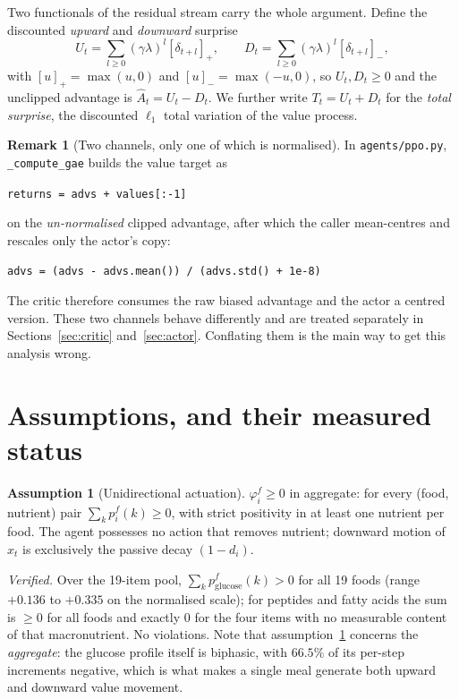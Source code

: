 \documentclass[11pt]{article}
\theoremstyle{definition}
\newtheorem{assumption}{Assumption}
\newtheorem{remark}[theorem]{Remark}
\newcommand{\Ahat}{\hat A}
\newcommand{\up}[1]{\left[#1\right]_{+}}
\newcommand{\dn}[1]{\left[#1\right]_{-}}
\begin{document}
Two functionals of the residual stream carry the whole argument. Define the
discounted \emph{upward} and \emph{downward} surprise
\begin{equation}
U_t=\sum_{l\ge0}(\gamma\lambda)^l\up{\delta_{t+l}},
\qquad
D_t=\sum_{l\ge0}(\gamma\lambda)^l\dn{\delta_{t+l}},
\label{eq:UD}
\end{equation}
with $\up{u}=\max(u,0)$ and $\dn{u}=\max(-u,0)$, so $U_t,D_t\ge0$ and the
unclipped advantage is $\Ahat_t=U_t-D_t$. We further write
$T_t=U_t+D_t$ for the \emph{total surprise}, the discounted $\ell_1$ total
variation of the value process.

\begin{remark}[Two channels, only one of which is normalised]
\label{rem:channels}
In \texttt{agents/ppo.py}, \texttt{\_compute\_gae} builds the value target as
\begin{center}
\texttt{returns = advs + values[:-1]}
\end{center}
on the \emph{un-normalised} clipped advantage, after which the caller
mean-centres and rescales only the actor's copy:
\begin{center}
\texttt{advs = (advs - advs.mean()) / (advs.std() + 1e-8)}
\end{center}
The critic
therefore consumes the raw biased advantage and the actor a centred version.
These two channels behave differently and are treated separately in
Sections~\ref{sec:critic} and~\ref{sec:actor}. Conflating them is the main
way to get this analysis wrong.
\end{remark}

\section{Assumptions, and their measured status}
\label{sec:assumptions}

\begin{assumption}[Unidirectional actuation]
\label{as:actuation}
$\varphi^f_i\ge0$ in aggregate: for every (food, nutrient) pair
$\sum_k p^f_i(k)\ge0$, with strict positivity in at least one nutrient per
food. The agent possesses no action that removes nutrient; downward motion of
$x_t$ is exclusively the passive decay $(1-d_i)$.
\end{assumption}

\noindent
\emph{Verified.} Over the 19-item pool, $\sum_k p^f_{\text{glucose}}(k)>0$ for
all 19 foods (range $+0.136$ to $+0.335$ on the normalised scale); for
peptides and fatty acids the sum is $\ge0$ for all foods and exactly $0$ for
the four items with no measurable content of that macronutrient. No
violations. Note that assumption~\ref{as:actuation} concerns the
\emph{aggregate}: the glucose profile itself is biphasic, with $66.5\%$ of its
per-step increments negative, which is what makes a single meal generate both
upward and downward value movement.
\end{document}
